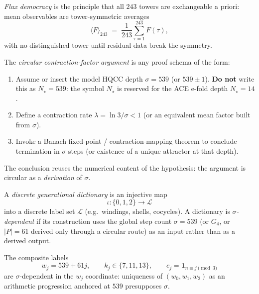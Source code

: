 \begin{definition}
\label{def:flux-dem}
\emph{Flux democracy} is the principle that all \(243\) towers are exchangeable
a priori: mean observables are tower-symmetric averages
\[
\langle F\rangle_{243}
\;=\;
\frac{1}{243}\sum_{\tau=1}^{243} F(\tau),
\]
with no distinguished tower until residual data break the symmetry.
\end{definition}

\begin{definition}
\label{def:circ-arg}
The \emph{circular contraction-factor argument} is any proof schema of the form:
\begin{enumerate}[label=(\arabic*)]
  \item Assume or insert the model HQCC depth \(\sigma=539\) (or \(539\pm 1\)).
        \textbf{Do not} write this as \(N_\star=539\): the symbol \(N_\star\) is
        reserved for the ACE e-fold depth \(N_\star=14\).
  \item Define a contraction rate \(\lambda=\ln 3/\sigma<1\) (or an equivalent
        mean factor built from \(\sigma\)).
  \item Invoke a Banach fixed-point / contraction-mapping theorem to conclude
        termination in \(\sigma\) steps (or existence of a unique attractor at
        that depth).
\end{enumerate}
The conclusion reuses the numerical content of the hypothesis: the argument is
circular as a \emph{derivation} of \(\sigma\).
\end{definition}

\begin{definition}
\label{def:gen-dict}
A \emph{discrete generational dictionary} is an injective map
\[
\iota\colon\{0,1,2\}\to\mathcal{L}
\]
into a discrete label set \(\mathcal{L}\) (e.g.\ windings, shells, cocycles).
A dictionary is \emph{\(\sigma\)-dependent} if its construction uses the global
step count \(\sigma=539\) (or \(G_4\), or \(|P|=61\) derived only through a
circular route) as an input rather than as a derived output.
\end{definition}

\begin{example}
The composite labels
\[
w_j=539+61j,\qquad
k_j\in\{7,11,13\},\qquad
c_j=\mathbf{1}_{n\equiv j\pmod{3}}
\]
are \(\sigma\)-dependent in the \(w_j\) coordinate: uniqueness of
\((w_0,w_1,w_2)\) as an arithmetic progression anchored at \(539\) presupposes
\(\sigma\).
\end{example}

